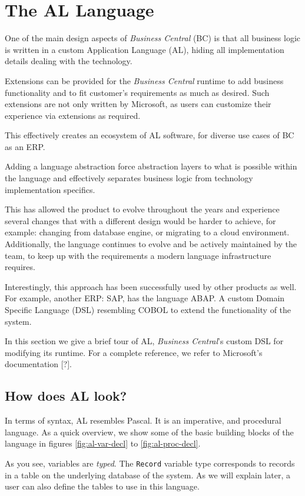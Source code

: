 \chapter{The AL Language}
\label{sec:appendix-allang}
One of the main design aspects of \emph{Business Central} (BC) is that all business logic is written in 
a custom Application Language (AL), hiding all implementation details dealing with the technology.

Extensions can be provided for the \emph{Business Central} runtime to add business functionality
and to fit customer's requirements as much as desired. Such extensions are not only written by
Microsoft, as users can customize their experience via extensions as required.

This effectively creates an ecosystem of AL software, for diverse use cases of BC as an ERP.

Adding a language abstraction force abstraction layers to what is possible within the language
and effectively separates business logic from technology implementation specifics.

This has allowed the product to evolve throughout the years and experience several changes 
that with a different design would be harder to achieve, for example: changing from 
database engine, or migrating to a cloud environment. Additionally, the language continues
to evolve and be actively maintained by the team, to keep up with the requirements
a modern language infrastructure requires.

Interestingly, this approach has been successfully used by other products as well. For example,
another ERP: SAP, has the language ABAP. A custom Domain Specific Language (DSL) resembling COBOL
to extend the functionality of the system.

In this section we give a brief tour of AL, \emph{Business Central}'s custom DSL for modifying
its runtime. For a complete reference, we refer to Microsoft's documentation [?].

\section{How does AL look?}

In terms of syntax, AL resembles Pascal. It is an imperative, and procedural language. 
As a quick overview, we show some of the basic building blocks of the language
in figures \ref{fig:al-var-decl} to \ref{fig:al-proc-decl}.

As you see, variables are \emph{typed}. The \texttt{Record} variable type corresponds to
records in a table on the underlying database of the system. As we will explain later,
a user can also define the tables to use in this language.

